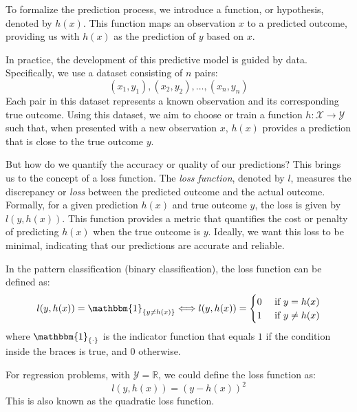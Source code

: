 \documentclass[11pt]{article}
\begin{document}
    To formalize the prediction process, we introduce a function, or hypothesis, denoted by $h(x)$. This function maps an observation $x$ to a predicted outcome, providing us with $h(x)$ as the prediction of $y$ based on $x$.

    In practice, the development of this predictive model is guided by data. Specifically, we use a dataset consisting of $n$ pairs:
    $$
    (x_1, y_1), (x_2, y_2), \dots, (x_n, y_n)
    $$
    Each pair in this dataset represents a known observation and its corresponding true outcome. Using this dataset, we aim to choose or train a function $h : \mathcal{X} \rightarrow \mathcal{Y}$ such that, when presented with a new observation $x$, $h(x)$ provides a prediction that is close to the true outcome $y$.

    But how do we quantify the accuracy or quality of our predictions? This brings us to the concept of a loss function. The \textit{loss function}, denoted by $l$, measures the discrepancy or \textit{loss} between the predicted outcome and the actual outcome. Formally, for a given prediction $h(x)$ and true outcome $y$, the loss is given by $l(y, h(x))$. This function provides a metric that quantifies the cost or penalty of predicting $h(x)$ when the true outcome is $y$. Ideally, we want this loss to be minimal, indicating that our predictions are accurate and reliable.

    \begin{example}
        In the pattern classification (binary classification), the loss function can be defined as:
        \begin{equation}
            l(y, h(x)) = \mathbbm{1}_{\{y \neq h(x)\}} \Longleftrightarrow
            l(y, h(x)) = \begin{cases}
                             0 & \text{ if } y = h(x) \\
                             1 & \text{ if } y \neq h(x)
            \end{cases}
        \end{equation}
        where $\mathbbm{1}_{\{ \cdot \}}$ is the indicator function that equals $1$ if the condition inside the braces is true, and $0$ otherwise.

        For regression problems, with $\mathcal{Y} = \mathbb{R}$, we could define the loss function as:
        \begin{equation}
            l(y, h(x)) = (y - h(x))^2
        \end{equation}
        This is also known as the quadratic loss function.
    \end{example}
\end{document}
